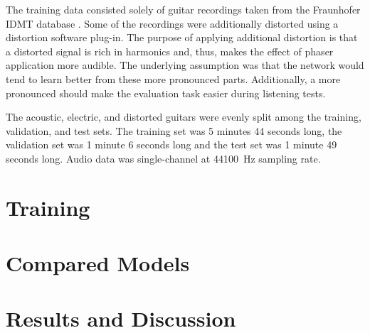 The training data consisted solely of guitar recordings taken from the Fraunhofer IDMT database \cite{Kehling2014}. Some of the recordings were additionally distorted using a distortion  software plug-in. The purpose of applying additional distortion is that a distorted signal is rich in harmonics and, thus, makes the effect of phaser application more audible. The underlying assumption was that the network would tend to learn better from these more pronounced parts. Additionally, a more pronounced should make the evaluation task easier during listening tests. 

The acoustic, electric, and distorted guitars were evenly split among the training, validation, and test sets. The training set was 5 minutes 44 seconds long, the validation set was 1 minute 6 seconds long and the test set was 1 minute 49 seconds long. Audio data was single-channel at \SI{44100}{Hz} sampling rate.


\section{Training}
\label{sec:phaser_training}

\section{Compared Models}
\label{sec:phaser_models}


\section{Results and Discussion}
\label{sec:phaser_results}


